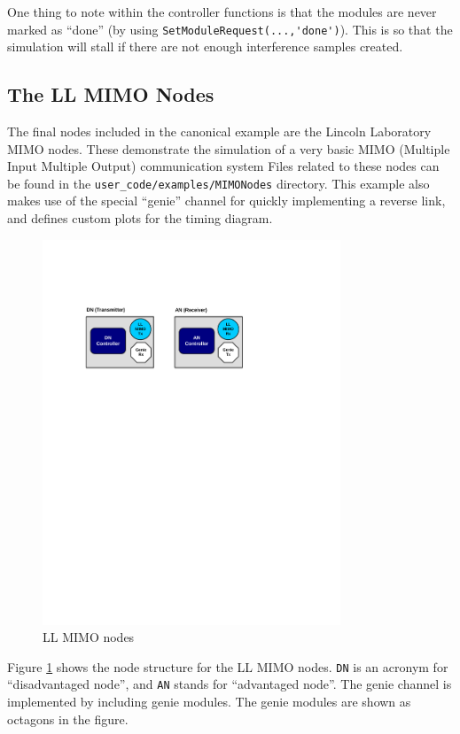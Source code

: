 One thing to note within the controller functions is that the
modules are never marked as ``done'' (by using
\verb+SetModuleRequest(...,'done')+). This is so that the simulation
will stall if there are not enough interference samples created.

\subsection{The LL MIMO Nodes}\label{sec:llmimoNodes}

The final nodes included in the canonical example are the Lincoln
Laboratory MIMO nodes.  These demonstrate the simulation of a very
basic MIMO (Multiple Input Multiple Output) communication system
Files related to these nodes can be found in the 
\verb+user_code/examples/MIMONodes+ directory.
This example also makes use of the special ``genie'' channel for
quickly implementing a reverse link, and defines custom plots for
the timing diagram.

\begin{figure}[h]
\centering
\includegraphics[width=3.5in]{figs/LL_MIMO_Example}
\caption{LL MIMO nodes} \label{fig:llmimoNodes}
\end{figure}

Figure \ref{fig:llmimoNodes} shows the node structure for the LL
MIMO nodes.%
\verb+DN+ is an acronym for ``disadvantaged node'', and \verb+AN+ stands for ``advantaged node''.  The genie channel is implemented by including genie
modules. The genie modules are shown as octagons in the figure.

